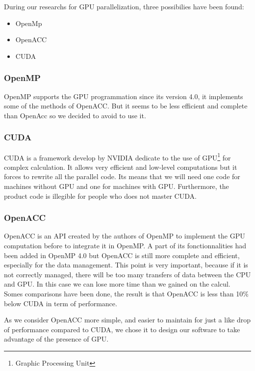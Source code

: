 During our researchs for GPU parallelization, three possibilies have been found:
\begin{itemize}
\item OpenMp
\item OpenACC
\item CUDA
\end{itemize}


\subsubsection{OpenMP}
OpenMP supports the GPU programmation since its version 4.0, it implements some of the methods of OpenACC. But it seems to be less efficient and complete than OpenAcc so we decided to avoid to use it.

\subsubsection{CUDA}
CUDA is a framework develop by NVIDIA dedicate to the use of GPU\footnote{Graphic Processing Unit} for complex calculation. It allows very efficient and low-level computations but it forces to rewrite all the parallel code. Its means that we will need one code for machines without GPU and one for machines with GPU. Furthermore, the product code is illegible for people who does not master CUDA.

\subsubsection{OpenACC}
OpenACC is an API created by the authors of OpenMP to implement the GPU computation before to integrate it in OpenMP. A part of its fonctionnalities had been added in OpenMP 4.0 but OpenACC is still more complete and efficient, especially for the data management. This point is very important, because if it is not correctly managed, there will be too many transfers of data between the CPU and GPU. In this case we can lose more time than we gained on the calcul. Somes comparisons have been done, the result is that OpenACC is less than 10\% below CUDA in term of performance. 

As we consider OpenACC more simple, and easier to maintain for just a like drop of performance compared to CUDA, we chose it to design our software to take advantage of the presence of GPU.